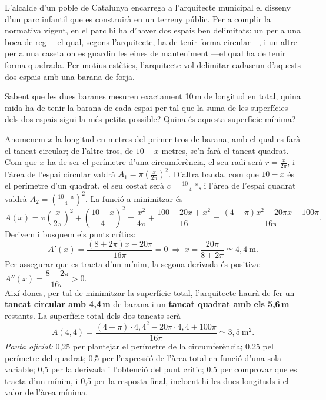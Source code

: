 L'alcalde d'un poble de Catalunya encarrega a l'arquitecte municipal el disseny d'un parc
infantil que es construirà en un terreny públic. Per a complir la normativa vigent, en el parc
hi ha d'haver dos espais ben delimitats: un per a una boca de reg ---el qual, segons
l'arquitecte, ha de tenir forma circular---, i un altre per a una caseta on es guardin les
eines de manteniment ---el qual ha de tenir forma quadrada. Per motius estètics, l'arquitecte
vol delimitar cadascun d'aquests dos espais amb una barana de forja.

\begin{apartats}

Sabent que les dues baranes mesuren exactament 10\,m de longitud en total, quina mida ha de
tenir la barana de cada espai per tal que la suma de les superfícies dels dos espais sigui la
més petita possible? Quina és aquesta superfície mínima?

\begin{solucio}
Anomenem $x$ la longitud en metres del primer tros de barana, amb el qual es farà el tancat
circular; de l'altre tros, de $10-x$ metres, se'n farà el tancat quadrat. Com que $x$ ha de
ser el perímetre d'una circumferència, el seu radi serà $r=\frac{x}{2\pi}$, i l'àrea de
l'espai circular valdrà $A_1=\pi\left(\frac{x}{2\pi}\right)^2$. D'altra banda, com que
$10-x$ és el perímetre d'un quadrat, el seu costat serà $c=\frac{10-x}{4}$, i l'àrea de
l'espai quadrat valdrà $A_2=\left(\frac{10-x}{4}\right)^2$. La funció a minimitzar és
\[
A(x)=\pi\left(\frac{x}{2\pi}\right)^2+\left(\frac{10-x}{4}\right)^2
=\frac{x^2}{4\pi}+\frac{100-20x+x^2}{16}
=\frac{(4+\pi)x^2-20\pi x+100\pi}{16\pi}.
\]
Derivem i busquem els punts crítics:
\[
A'(x)=\frac{(8+2\pi)x-20\pi}{16\pi}=0\ \Longrightarrow\ x=\frac{20\pi}{8+2\pi}\simeq4{,}4\ \text{m}.
\]
Per assegurar que es tracta d'un mínim, la segona derivada és positiva:
$A''(x)=\dfrac{8+2\pi}{16\pi}>0$.\\
Així doncs, per tal de minimitzar la superfície total, l'arquitecte haurà de fer un
\textbf{tancat circular amb 4,4\,m} de barana i un \textbf{tancat quadrat amb els 5,6\,m}
restants. La superfície total dels dos tancats serà
\[
A(4{,}4)=\frac{(4+\pi)\cdot4{,}4^2-20\pi\cdot4{,}4+100\pi}{16\pi}\simeq3{,}5\ \text{m}^2.
\]
\textit{Pauta oficial:} 0,25 per plantejar el perímetre de la circumferència; 0,25 pel
perímetre del quadrat; 0,5 per l'expressió de l'àrea total en funció d'una sola variable;
0,5 per la derivada i l'obtenció del punt crític; 0,5 per comprovar que es tracta d'un mínim,
i 0,5 per la resposta final, incloent-hi les dues longituds i el valor de l'àrea mínima.
\end{solucio}

\end{apartats}
